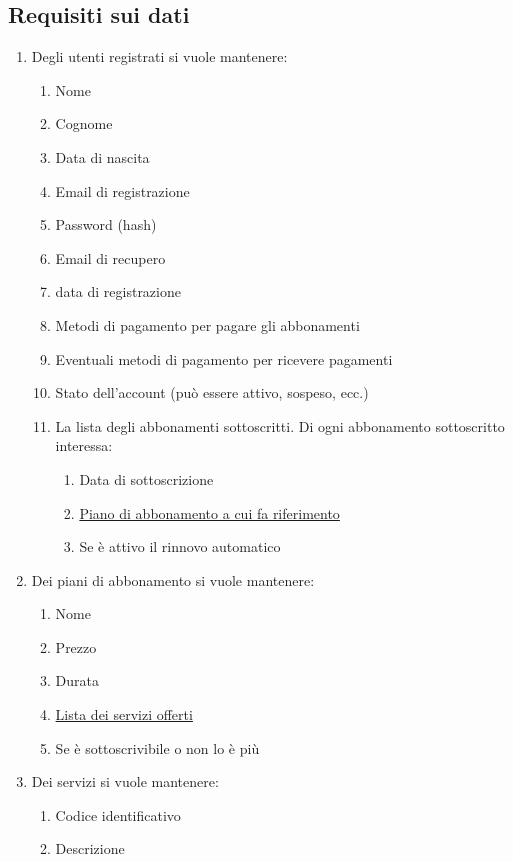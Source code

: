 
\subsection{Requisiti sui dati}
\begin{enumerate}

\item \hypertarget{AnReqUt}{Degli utenti registrati si vuole mantenere:}
	\begin{enumerate}[label*=\arabic*.]
	\item Nome
	\item Cognome
	\item Data di nascita
	\item Email di registrazione
	\item Password (hash)
	\item Email di recupero
	\item data di registrazione
	\item Metodi di pagamento per pagare gli abbonamenti
	\item Eventuali metodi di pagamento per ricevere pagamenti
	\item Stato dell'account (può essere attivo, sospeso, ecc.)
	\item La lista degli abbonamenti sottoscritti. Di ogni abbonamento sottoscritto interessa:
		\begin{enumerate}[label*=\arabic*.]
		\item Data di sottoscrizione
		\item \hyperlink{AnReqPianiAbb}{Piano di abbonamento a cui fa riferimento}
		\item Se è attivo il rinnovo automatico
		\end{enumerate}
	\end{enumerate}

\item \hypertarget{AnReqPianiAbb}{Dei piani di abbonamento si vuole mantenere:}
	\begin{enumerate}[label*=\arabic*.]
	\item Nome
	\item Prezzo
	\item Durata
	\item \hyperlink{AnReqServizi}{Lista dei servizi offerti}
	\item Se è sottoscrivibile o non lo è più
	\end{enumerate}

\item \hypertarget{AnReqServizi}{Dei servizi si vuole mantenere:}
	\begin{enumerate}[label*=\arabic*.]
	\item Codice identificativo
	\item Descrizione
	\end{enumerate}


\end{enumerate}
